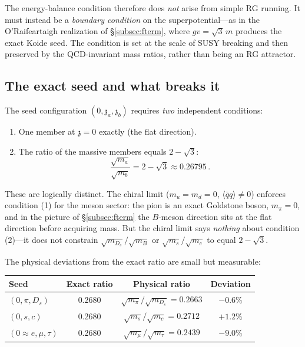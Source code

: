 \documentclass[12pt,a4paper]{article}
\newcommand{\qqbar}{\langle\bar{q}q\rangle}
\newcommand{\zch}{\mathfrak{z}}
\begin{document}
The energy-balance condition therefore does \emph{not} arise from
simple RG running. It must instead be a \emph{boundary condition}
on the superpotential---as in the O'Raifeartaigh realization of
\S\ref{subsec:fterm}, where $gv = \sqrt{3}\,m$ produces the exact
Koide seed. The condition is set at the scale of SUSY breaking and
then preserved by the QCD-invariant mass ratios, rather than being
an RG attractor.

\subsection{The exact seed and what breaks it}
\label{subsec:exactseed}

The seed configuration $(0, \zch_a, \zch_b)$ requires \emph{two} 
independent conditions:
\begin{enumerate}
\item One member at $\zch = 0$ exactly (the flat direction).
\item The ratio of the massive members equals $2 - \sqrt{3}$:
\begin{equation}
\frac{\sqrt{m_a}}{\sqrt{m_b}} = 2 - \sqrt{3} \approx 0.26795\,.
\end{equation}
\end{enumerate}
These are logically distinct. The chiral limit ($m_u = m_d = 0$, 
$\qqbar \neq 0$) enforces condition (1) for the meson sector: the 
pion is an exact Goldstone boson, $m_\pi = 0$, and in the 
picture of \S\ref{subsec:fterm} the $B$-meson direction sits at 
the flat direction before acquiring mass. But the chiral limit says 
\emph{nothing} about condition (2)---it does not constrain 
$\sqrt{m_{D_s}}/\sqrt{m_B}$ or $\sqrt{m_s}/\sqrt{m_c}$ 
to equal $2 - \sqrt{3}$.

The physical deviations from the exact ratio are small but 
measurable:

\begin{center}
\begin{tabular}{lccc}
\toprule
Seed & Exact ratio & Physical ratio & Deviation \\
\midrule
$(0, \pi, D_s)$ & 0.2680 & 
$\sqrt{m_\pi}/\sqrt{m_{D_s}} = 0.2663$ & $-0.6\%$ \\
$(0, s, c)$ & 0.2680 & 
$\sqrt{m_s}/\sqrt{m_c} = 0.2712$ & $+1.2\%$ \\
$(0 \approx e, \mu, \tau)$ & 0.2680 & 
$\sqrt{m_\mu}/\sqrt{m_\tau} = 0.2439$ & $-9.0\%$ \\
\bottomrule
\end{tabular}
\end{center}
\end{document}
